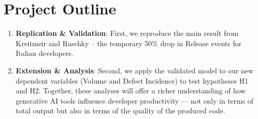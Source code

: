 \section*{Project Outline}

\begin{enumerate}
  \item \textbf{Replication \& Validation}: First, we reproduce the main result from Kreitmeir and Raschky \cite{Kreitmeir2023} – the temporary 50\% drop in Release events for Italian developers.
  \item \textbf{Extension \& Analysis}: Second, we apply the validated model to our new dependent variables (Volume and Defect Incidence) to test hypotheses H1 and H2. Together, these analyses will offer a richer understanding of how generative AI tools influence developer productivity — not only in terms of total output but also in terms of the quality of the produced code.
\end{enumerate}
